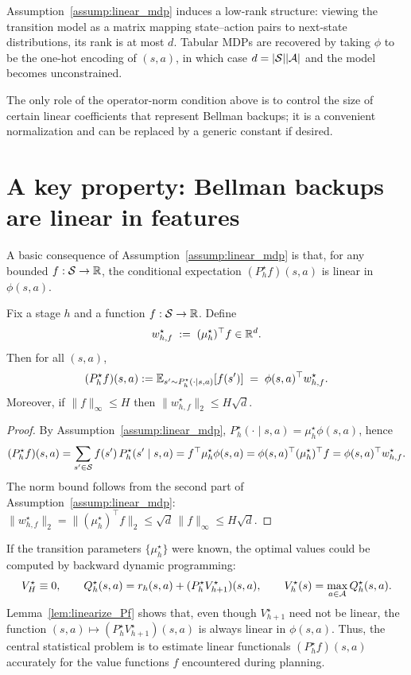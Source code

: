 Assumption~\ref{assump:linear_mdp} induces a low-rank structure: viewing the transition model
as a matrix mapping state--action pairs to next-state distributions, its rank is at most $d$.
Tabular MDPs are recovered by taking $\phi$ to be the one-hot encoding of $(s,a)$, in which
case $d=|\mathcal{S}||\mathcal{A}|$ and the model becomes unconstrained.

The only role of the operator-norm condition above is to control the size of certain
linear coefficients that represent Bellman backups; it is a convenient normalization and
can be replaced by a generic constant if desired.


\section{A key property: Bellman backups are linear in features}
\label{sec:linear_mdp_backup_is_linear}

A basic consequence of Assumption~\ref{assump:linear_mdp} is that, for any bounded
$f:\mathcal{S}\to\mathbb{R}$, the conditional expectation $(P_h^\star f)(s,a)$ is linear in $\phi(s,a)$.

\begin{lemma}\label{lem:linearize_Pf}
Fix a stage $h$ and a function $f:\mathcal{S}\to\mathbb{R}$.  Define
\[
w_{h,f}^\star \;:=\; (\mu_h^\star)^\top f \in \mathbb{R}^d.
\]
Then for all $(s,a)$,
\[
(P_h^\star f)(s,a)
:= \mathbb{E}_{s'\sim P_h^\star(\cdot\mid s,a)}[f(s')]
\;=\;
\phi(s,a)^\top w_{h,f}^\star.
\]
Moreover, if $\|f\|_\infty\le H$ then $\|w_{h,f}^\star\|_2\le H\sqrt{d}$.
\end{lemma}

\begin{proof}
By Assumption~\ref{assump:linear_mdp}, $P_h^\star(\cdot\mid s,a)=\mu_h^\star\phi(s,a)$, hence
\[
(P_h^\star f)(s,a) = \sum_{s'\in\mathcal{S}} f(s')\,P_h^\star(s'\mid s,a)
= f^\top \mu_h^\star \phi(s,a)
= \phi(s,a)^\top (\mu_h^\star)^\top f
= \phi(s,a)^\top w_{h,f}^\star.
\]
The norm bound follows from the second part of Assumption~\ref{assump:linear_mdp}:
$\|w_{h,f}^\star\|_2=\|(\mu_h^\star)^\top f\|_2\le \sqrt d\,\|f\|_\infty\le H\sqrt d$.
\end{proof}

If the transition parameters $\{\mu_h^\star\}$ were known, the optimal values could be
computed by backward dynamic programming:
\[
V_H^\star\equiv 0,\qquad
Q_h^\star(s,a)=r_h(s,a)+(P_h^\star V_{h+1}^\star)(s,a),\qquad
V_h^\star(s)=\max_{a\in\mathcal{A}}Q_h^\star(s,a).
\]
Lemma~\ref{lem:linearize_Pf} shows that, even though $V_{h+1}^\star$ need not be linear,
the function $(s,a)\mapsto (P_h^\star V_{h+1}^\star)(s,a)$ is always linear in $\phi(s,a)$.
Thus, the central statistical problem is to estimate linear functionals
$(P_h^\star f)(s,a)$ accurately for the value functions $f$ encountered during planning.

